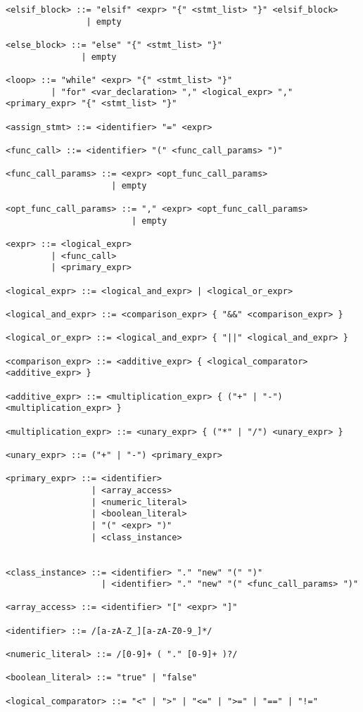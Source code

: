 \documentclass{TDP003mall}
\begin{document}
\begin{verbatim}
<elsif_block> ::= "elsif" <expr> "{" <stmt_list> "}" <elsif_block>
                | empty

<else_block> ::= "else" "{" <stmt_list> "}"
               | empty

<loop> ::= "while" <expr> "{" <stmt_list> "}"
         | "for" <var_declaration> "," <logical_expr> "," <primary_expr> "{" <stmt_list> "}"

<assign_stmt> ::= <identifier> "=" <expr>

<func_call> ::= <identifier> "(" <func_call_params> ")"

<func_call_params> ::= <expr> <opt_func_call_params>
                     | empty

<opt_func_call_params> ::= "," <expr> <opt_func_call_params>
                         | empty

<expr> ::= <logical_expr> 
         | <func_call>
         | <primary_expr>

<logical_expr> ::= <logical_and_expr> | <logical_or_expr>

<logical_and_expr> ::= <comparison_expr> { "&&" <comparison_expr> }

<logical_or_expr> ::= <logical_and_expr> { "||" <logical_and_expr> }

<comparison_expr> ::= <additive_expr> { <logical_comparator> <additive_expr> }

<additive_expr> ::= <multiplication_expr> { ("+" | "-") <multiplication_expr> }

<multiplication_expr> ::= <unary_expr> { ("*" | "/") <unary_expr> }

<unary_expr> ::= ("+" | "-") <primary_expr>

<primary_expr> ::= <identifier> 
                 | <array_access>
                 | <numeric_literal> 
                 | <boolean_literal>
                 | "(" <expr> ")"
                 | <class_instance>


<class_instance> ::= <identifier> "." "new" "(" ")"
                   | <identifier> "." "new" "(" <func_call_params> ")"

<array_access> ::= <identifier> "[" <expr> "]"

<identifier> ::= /[a-zA-Z_][a-zA-Z0-9_]*/

<numeric_literal> ::= /[0-9]+ ( "." [0-9]+ )?/

<boolean_literal> ::= "true" | "false"

<logical_comparator> ::= "<" | ">" | "<=" | ">=" | "==" | "!="
    
\end{verbatim}
\end{document}
